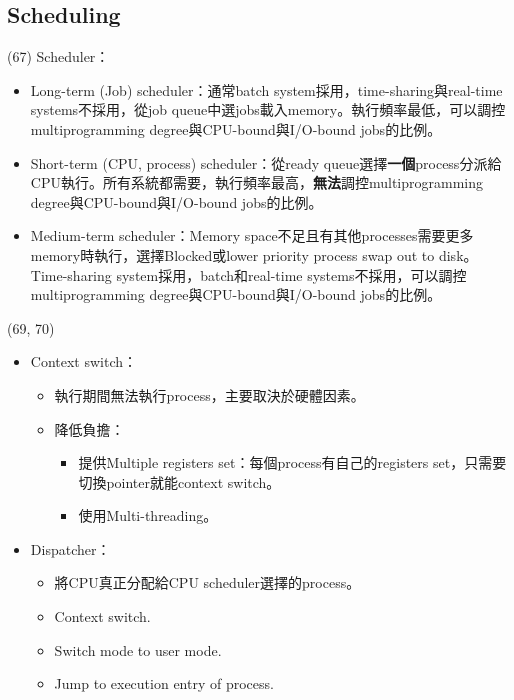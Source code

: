 \subsection{Scheduling}

\begin{theorem}{(67)} Scheduler：\begin{itemize}
        \item Long-term (Job) scheduler：通常batch system採用，time-sharing與real-time systems不採用，從job queue中選jobs載入memory。執行頻率最低，可以調控multiprogramming degree與CPU-bound與I/O-bound jobs的比例。
        \item Short-term (CPU, process) scheduler：從ready queue選擇\textbf{一個}process分派給CPU執行。所有系統都需要，執行頻率最高，\textbf{無法}調控multiprogramming degree與CPU-bound與I/O-bound jobs的比例。
        \item Medium-term scheduler：Memory space不足且有其他processes需要更多memory時執行，選擇Blocked或lower priority process swap out to disk。Time-sharing system採用，batch和real-time systems不採用，可以調控multiprogramming degree與CPU-bound與I/O-bound jobs的比例。
    \end{itemize}
\end{theorem}

\begin{theorem}{(69, 70)} \quad\quad \begin{itemize}
        \item Context switch：\begin{itemize}
            \item 執行期間無法執行process，主要取決於硬體因素。
            \item 降低負擔：\begin{itemize}
                \item 提供Multiple registers set：每個process有自己的registers set，只需要切換pointer就能context switch。
                \item 使用Multi-threading。
            \end{itemize}
        \end{itemize}
        \item Dispatcher：\begin{itemize}
            \item 將CPU真正分配給CPU scheduler選擇的process。
            \item Context switch.
            \item Switch mode to user mode.
            \item Jump to execution entry of process.
        \end{itemize}
    \end{itemize}
\end{theorem}

